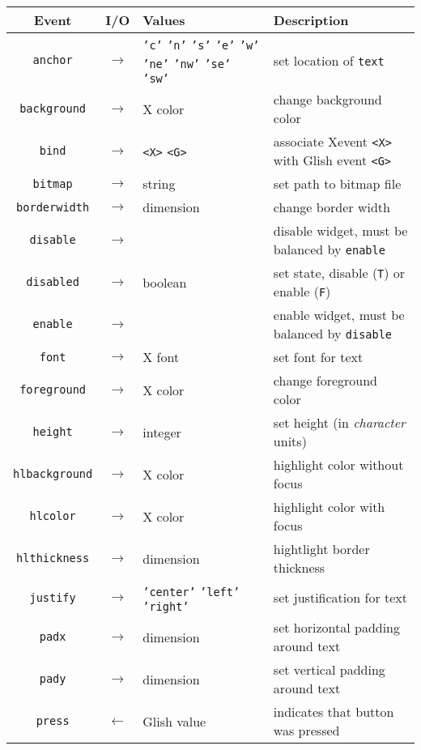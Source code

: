\begin{table}[tbh]
{\small
\begin{center}
\begin{tabular}{|c|c|p{1.6in}|p{2.5in}|}
\hline
Event & I/O & Values & Description \\
\hline
\hline
{\tt anchor}    &$\rightarrow$& {\tt 'c'} {\tt 'n'} {\tt 's'} {\tt 'e'} {\tt 'w'} {\tt 'ne'} {\tt 'nw'} {\tt 'se'} {\tt 'sw'} & set location of {\tt text} \\ \hline
{\tt background}&$\rightarrow$& X color & change background color \\ \hline
{\tt bind}	&$\rightarrow$&\verb+<X>+ \verb+<G>+& associate Xevent \verb+<X>+ with Glish event \verb+<G>+ \\ \hline
{\tt bitmap}    &$\rightarrow$& string & set path to bitmap file \\ \hline
{\tt borderwidth}&$\rightarrow$& dimension & change border width \\ \hline
{\tt disable}&$\rightarrow$& & disable widget, must be balanced by {\tt enable} \\ \hline
{\tt disabled}	&$\rightarrow$& boolean & set state, disable ({\tt T}) or enable ({\tt F}) \\ \hline
{\tt enable}&$\rightarrow$& & enable widget, must be balanced by {\tt disable} \\ \hline
{\tt font}      &$\rightarrow$& X font & set font for text \\ \hline
{\tt foreground}&$\rightarrow$& X color & change foreground color \\ \hline
{\tt height}    &$\rightarrow$& integer & set height (in {\em character} units) \\ \hline
{\tt hlbackground}&$\rightarrow$& X color & highlight color without focus \\ \hline
{\tt hlcolor}	&$\rightarrow$& X color & highlight color with focus \\ \hline
{\tt hlthickness}&$\rightarrow$& dimension & hightlight border thickness \\ \hline
{\tt justify}   &$\rightarrow$& {\tt 'center'} {\tt 'left'} {\tt 'right'} & set justification for text \\ \hline
{\tt padx}      &$\rightarrow$& dimension & set horizontal padding around text \\ \hline
{\tt pady}      &$\rightarrow$& dimension & set vertical padding around text \\ \hline
{\tt press}     &$\leftarrow$& Glish value & indicates that button was pressed \\ \hline

\end{tabular}
\end{center}}
\end{table}
